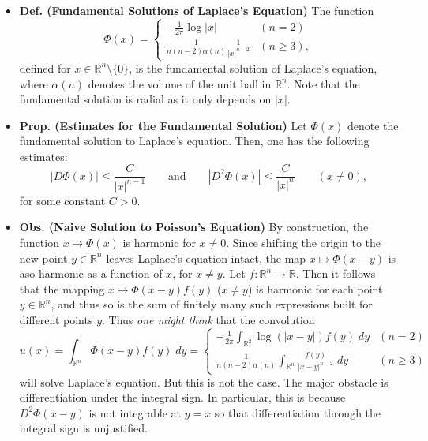 \documentclass{article}
\begin{document}
\begin{itemize}
		\item \textbf{Def. (Fundamental Solutions of Laplace's Equation)} The function 
		\begin{equation*}
			\Phi(x) = 
			\begin{cases}
				-\frac{1}{2\pi}\log|x| & (n = 2) \\
				\frac{1}{n(n-2)\alpha(n)}\frac{1}{|x|^{n-2}} & (n\geq 3), 
			\end{cases}
		\end{equation*}
		defined for $x \in \mathbb{R}^{n} \setminus \{0\}$, is the fundamental solution of Laplace's equation, where $\alpha(n)$ denotes the volume of the unit ball in $\mathbb{R}^{n}$. Note that the fundamental solution is radial as it only depends on $|x|$. 
		
		\item \textbf{Prop. (Estimates for the Fundamental Solution)} Let $\Phi(x)$ denote the fundamental solution to Laplace's equation. Then, one has the following estimates: 
		\begin{equation*}
			|D\Phi(x)| \leq \frac{C}{|x|^{n-1}} \qquad \text{and} \qquad |D^{2}\Phi(x)| \leq \frac{C}{|x|^{n}} \qquad (x \neq 0), 
		\end{equation*}
		for some constant $C > 0$. 
		
		\item \textbf{Obs. (Naive Solution to Poisson's Equation)} By construction, the function $x \mapsto \Phi(x)$ is harmonic for $x \neq 0$. Since shifting the origin to the new point $y \in \mathbb{R}^{n}$ leaves Laplace's equation intact, the map $x \mapsto \Phi(x - y)$ is aso harmonic as a function of $x$, for $x \neq y$. Let $f: \mathbb{R}^{n} \to \mathbb{R}$. Then it follows that the mapping $x \mapsto \Phi(x -y)f(y)$ ($x \neq y$) is harmonic for each point $y \in \mathbb{R}^{n}$, and thus so is the sum of finitely many such expressions built for different points $y$. Thus \textit{one might think} that the convolution 
		\begin{equation*}
			u(x) = \int_{\mathbb{R}^{n}}\Phi(x-y)f(y)\;dy = 
			\begin{cases}
				\displaystyle -\frac{1}{2\pi}\int_{\mathbb{R}^{2}}\log(|x-y|)f(y)\;dy & (n = 2) \\
				\displaystyle \frac{1}{n(n-2)\alpha(n)}\int_{\mathbb{R}^{n}}\frac{f(y)}{|x-y|^{n-2}}\;dy & (n \geq 3)
			\end{cases}
		\end{equation*}
		will solve Laplace's equation. But this is not the case. The major obstacle is differentiation under the integral sign. In particular, this is because $D^{2}\Phi(x - y)$ is not integrable at $y= x$ so that differentiation through the integral sign is unjustified. 
		

\end{itemize}
\end{document}
